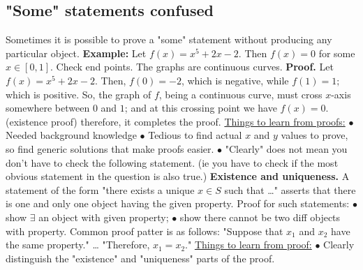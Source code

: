\documentclass{article}
\begin{document}
\subsection{"Some" statements confused}
Sometimes it is possible to prove a "some" statement without producing any particular object.
\newline
\newline
\textbf{Example: } Let $f(x) = x^5 + 2x - 2.$ Then $f(x) = 0$ for some $x \in [0, 1].$
\newline
Check end points. The graphs are continuous curves.
\newline
\newline
\textbf{Proof. } Let $f(x) = x^5 + 2x - 2.$  Then, $f(0) = -2$, which is negative, while $f(1) = 1;$ which is positive.
So, the graph of $f$, being a continuous curve, must cross $x$-axis somewhere between $0$ and $1$; and at this crossing point we have $f(x) = 0.$
\newline
(existence proof) therefore, it completes the proof.
\newline
{}
\newline
\newline
\underline{Things to learn from proofs:}
\newline
\newline
$\bullet $ Needed background knowledge
\newline
$\bullet $ Tedious to find actual $x$ and $y$ values to prove, so find generic solutions that make proofs easier.
\newline
$\bullet $ "Clearly" does not mean you don't have to check the following statement. (ie you have to check if the most obvious statement in the question is also true.)
\newline 
\newline
\textbf{Existence and uniqueness. } A statement of the form "there exists a unique $x \in S$ such that \dots"
\newline
asserts that there is one and only one object having the given property.
\newline
\newline
Proof for such statements:
\newline
$\bullet $ show $\exists$ an object with given property;
\newline
$\bullet $ show there cannot be two diff objects with property. Common proof patter is as follows:
\newline
\newline
"Suppose that $x_1$ and $x_2$ have the same property."
\newline
\dots
\newline
"Therefore, $x_1 = x_2$."
\newline
\newline
[examples in word: $a = bq + r.$]
\newline
\newline
\underline{Things to learn from proof:}
\newline
$\bullet $ Clearly distinguish the "existence" and "uniqueness" parts of the proof.
\newpage
\end{document}
